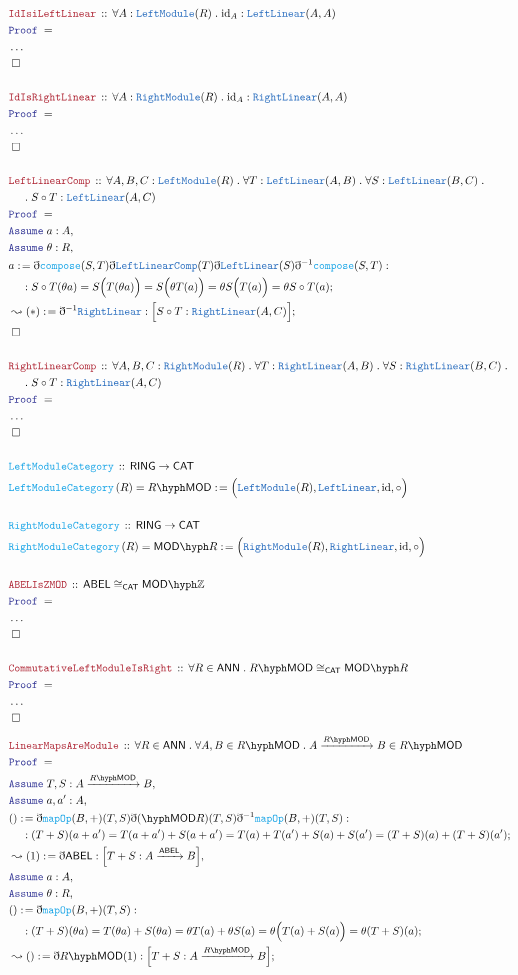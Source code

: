 \documentclass[12pt]{scrartcl}
\newcommand{\TYPE}[1]{\textcolor{NavyBlue}{\mathtt{#1}}}
\newcommand{\FUNC}[1]{\textcolor{Cerulean}{\mathtt{#1}}}
\newcommand{\LOGIC}[1]{\textcolor{Blue}{\mathtt{#1}}}
\newcommand{\THM}[1]{\textcolor{Maroon}{\mathtt{#1}}}
\renewcommand{\.}{\; . \;}
\newcommand{\de}{: \kern 0.1pc =}
\newcommand{\Act}[1]{\left(#1\right)}
\newcommand{\Theorem}[2]{& \THM{#1} \, :: \, #2 \\ & \Proof = \\ }
\newcommand{\DeclareFunc}[2]{& \FUNC{#1} \, :: \, #2 \\}
\newcommand{\DefineNamedFunc}[4]{&  \FUNC{#1}\Act{#2} = #3 \de #4 \\}
\newcommand{\NewLine}{\\ & \kern 1pc}
\newcommand{\Page}[1]{ \begin{align*} #1 \end{align*}   }
\newcommand{ \bd }{ \ByDef }
\newcommand{\NoProof}{ & \ldots \\ \EndProof}
\newcommand{\Int}{\mathbb{Z} }
\DeclareMathOperator*{\id}{id}
\newcommand{\Conclude}[3]{& #1 \de #2 : #3; \\}
\newcommand{\Derive}[3]{& \leadsto #1 \de #2 : #3, \\}
\newcommand{\DeriveConclude}[3]{& \leadsto #1 \de #2 : #3 ; \\}
\newcommand{\Assume}[2]{& \LOGIC{Assume} \; #1 : #2, \\}
\newcommand{\QED}{\; \square}
\newcommand{\EndProof}{& \QED \\}
\newcommand{\ByDef}{\eth}
\newcommand{\Proof}{\LOGIC{Proof} \; }
\newcommand{\Arrow}[1]{\xrightarrow{#1}}
\newcommand{\CAT}{\mathsf{CAT}}
\newcommand{\ABEL}{\mathsf{ABEL}}
\newcommand{\LMOD}[1]{#1\hyph\mathsf{MOD}}
\newcommand{\RMOD}[1]{\mathsf{MOD}\hyph#1}
\newcommand{\RING}{\mathsf{RING}}
\newcommand{\ANN}{\mathsf{ANN}}
\begin{document}
\Page{
	\Theorem{IdIsiLeftLinear}{\forall A : \TYPE{LeftModule}(R) \. {\id}_A : \TYPE{LeftLinear}(A,A)}
	\NoProof
	\\
	\Theorem{IdIsRightLinear}{\forall A : \TYPE{RightModule}(R) \. {\id}_A : \TYPE{RightLinear}(A,A)}
	\NoProof
	\\
	\Theorem{ LeftLinearComp  }{ \forall A,B,C : \TYPE{LeftModule}(R) \. \forall T : \TYPE{LeftLinear}(A,B) \. \forall S : \TYPE{LeftLinear}(B,C) \. 
		\NewLine \. S \circ T : \TYPE{LeftLinear}(A,C)   }
	\Assume{a}{A}
	\Assume{\theta}{R}
	\Conclude{a}{\bd \FUNC{compose}(S,T)\bd \TYPE{LeftLinearComp}(T) \bd \TYPE{LeftLinear}(S)\bd^{-1}\FUNC{compose}(S,T)}
	{ \NewLine : 
	S \circ T (\theta a ) = S\Big( T(\theta a) \Big) = S\Big(\theta T(a) \Big) = \theta S\Big(T(a)\Big) = \theta S \circ T(a) }
	\DeriveConclude{(*)}{\bd^{-1}\TYPE{RightLinear}}{ \Big[  S \circ T : \TYPE{RightLinear}(A,C)   \Big]  }
	\EndProof
	\\
	\Theorem{ RightLinearComp  }{ \forall A,B,C : \TYPE{RightModule}(R) \. \forall T : \TYPE{RightLinear}(A,B) \. \forall S : \TYPE{RightLinear}(B,C) \. 
		\NewLine \. S \circ T : \TYPE{RightLinear}(A,C)   }
	\NoProof
	\\
	\DeclareFunc{LeftModuleCategory}{ \RING \to \CAT  }
	\DefineNamedFunc{LeftModuleCategory}{R}{\LMOD{R}}
	{\Big( \TYPE{LeftModule}(R),\TYPE{LeftLinear},\id,\circ \Big)}
	\\
	\DeclareFunc{RightModuleCategory}{ \RING \to \CAT  }
	\DefineNamedFunc{RightModuleCategory}{R}{\RMOD{R}}
	{\Big( \TYPE{RightModule}(R),\TYPE{RightLinear},\id,\circ \Big)}
	\\
	\Theorem{ABELIsZMOD}{\ABEL \cong_{\CAT} \RMOD{\Int}}
	\NoProof
	\\
	\Theorem{CommutativeLeftModuleIsRight}{\forall R \in \ANN \. \LMOD{R} \cong_{\CAT} \RMOD{R}}
	\NoProof
}\Page{
	\Theorem{LinearMapsAreModule}{ \forall R \in \ANN \. \forall A,B \in \LMOD{R} \. A \Arrow{\LMOD{R}} B \in \LMOD{R}  }
	\Assume{T,S}{A \Arrow{\LMOD{R}} B}
	\Assume{a,a'}{A}
	\Conclude{()}{\bd \FUNC{mapOp}(B,+)(T,S)\bd\LMOD(R)(T,S)\bd^{-1}\FUNC{mapOp}(B,+)(T,S)}
	{ \NewLine : 
		(T + S)(a + a') = T(a + a') + S(a + a') = T(a) + T(a') + S(a) + S(a') = (T + S)(a) + (T + S)(a')}
	\Derive{(1)}{\bd\ABEL}{\Big[ T + S : A \Arrow{\ABEL} B \Big]}
	\Assume{a}{A}
	\Assume{\theta}{R}
	\Conclude{()}{\bd \FUNC{mapOp}(B,+)(T,S)}
	{  \NewLine :
	  	(T + S)(\theta a) = T(\theta a) + S(\theta a) =\theta T(a) + \theta S(a) = \theta \Big( T(a) + S(a)\Big) = \theta (T + S)(a) }
	\DeriveConclude{()}{\bd \LMOD{R}(1) }{\Big[ T + S : A \Arrow{\LMOD{R}} B  \Big]}
}
\end{document}
